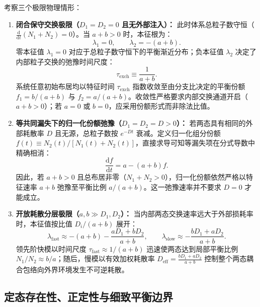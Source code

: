考察三个极限物理情形：
\begin{enumerate}
\item \textbf{闭合保守交换极限（$D_1 = D_2 = 0$ 且无外部注入）：}
此时体系总粒子数守恒（$\frac{\mathrm{d}}{\mathrm{d}t}(N_1 + N_2) = 0$）。当 $a + b > 0$ 时，本征根为：
\begin{equation}\label{eq:appD-closed-eigenvalues}
\lambda_1 = 0, \qquad \lambda_2 = -(a + b).
\end{equation}
零本征值 $\lambda_1 = 0$ 对应于总粒子数守恒下的平衡渐近分布；负本征值 $\lambda_2$ 决定了内部粒子交换的弛豫时间尺度：
\begin{equation}\label{eq:appD-texch-def}
\tau_{\mathrm{exch}} \equiv \frac{1}{a + b}.
\end{equation}
系统任意初始布居均以特征时间 $\tau_{\mathrm{exch}}$ 指数收敛至由分支比决定的平衡份额 $f_1 = b/(a+b)$ 与 $f_2 = a/(a+b)$。收敛性严格要求内部交换通道开启（$a + b > 0$）；若 $a=0$ 或 $b=0$，应采用份额形式而非除法比值。
\item \textbf{等共同漏失下的归一化份额弛豫（$D_1 = D_2 = D > 0$）：}
若两态具有相同的外部耗散率 $D$ 且无源，总粒子数按 $e^{-Dt}$ 衰减。定义归一化组分份额 $f(t) \equiv N_2(t) / [N_1(t) + N_2(t)]$，直接求导可知等漏失项在分式导数中精确相消：
\begin{equation}\label{eq:appD-equal-loss-relaxation}
\frac{\mathrm{d}f}{\mathrm{d}t} = a - (a + b) f.
\end{equation}
因此，若 $a+b>0$ 且总布居非零（$N_1 + N_2 > 0$），归一化份额依然严格以特征速率 $a + b$ 弛豫至平衡比例 $a/(a+b)$。这一弛豫速率并不要求 $D = 0$ 才能成立。
\item \textbf{开放耗散分层极限（$a, b \gg D_1, D_2$）：}
当内部两态交换速率远大于外部损耗率时，本征值按比值 $D_i / (a+b)$ 展开：
\begin{equation}\label{eq:appD-open-fast-slow}
\lambda_{\mathrm{fast}} \approx -(a + b) - \frac{a D_1 + b D_2}{a + b}, \qquad \lambda_{\mathrm{slow}} \approx -\frac{b D_1 + a D_2}{a + b}.
\end{equation}
领先阶快模以时间尺度 $\tau_{\mathrm{fast}} \approx 1/(a+b)$ 迅速使两态达到局部平衡比例 $N_1/N_2 \approx b/a$；随后，慢模以有效加权耗散率 $D_{\mathrm{eff}} = \frac{b D_1 + a D_2}{a + b}$ 控制整个两态耦合包络向外界环境发生不可逆耗散。
\end{enumerate}

\subsection{定态存在性、正定性与细致平衡边界}

